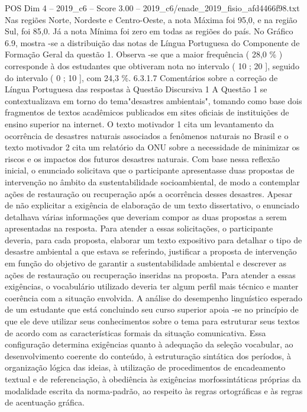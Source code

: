 \begin{textsample}{POS Dim 4 – 2019\_c6 – Score 3.00 – 2019\_c6/enade\_2019\_fisio\_afd4466f98.txt}
Nas regiões Norte, Nordeste e Centro-Oeste, a nota Máxima foi 95,0, e na região Sul, foi 85,0.
Já a nota Mínima foi zero em todas as regiões do país.
No Gráfico 6.9, mostra -se a distribuição das notas de Língua Portuguesa do Componente de Formação Geral da questão 1.
Observa -se que a maior frequência ( 28,0 \% ) corresponde à dos estudantes que obtiveram nota no intervalo ( 10 ; 20 ], seguido do intervalo ( 0 ; 10 ], com 24,3 \%. 6.3.1.7 Comentários sobre a correção de Língua Portuguesa das respostas à Questão Discursiva 1 A Questão 1 se contextualizava em torno do tema"desastres ambientais", tomando como base dois fragmentos de textos acadêmicos publicados em sites oficiais de instituições de ensino superior na internet.
O texto motivador 1 cita um levantamento da ocorrência de desastres naturais associados a fenômenos naturais no Brasil e o texto motivador 2 cita um relatório da ONU sobre a necessidade de minimizar os riscos e os impactos dos futuros desastres naturais.
Com base nessa reflexão inicial, o enunciado solicitava que o participante apresentasse duas propostas de intervenção no âmbito da sustentabilidade socioambiental, de modo a contemplar ações de restauração ou recuperação após a ocorrência desses desastres.
Apesar de não explicitar a exigência de elaboração de um texto dissertativo, o enunciado detalhava várias informações que deveriam compor as duas propostas a serem apresentadas na resposta.
Para atender a essas solicitações, o participante deveria, para cada proposta, elaborar um texto expositivo para detalhar o tipo de desastre ambiental a que estava se referindo, justificar a proposta de intervenção em função do objetivo de garantir a sustentabilidade ambiental e descrever as ações de restauração ou recuperação inseridas na proposta.
Para atender a essas exigências, o vocabulário utilizado deveria ter algum perfil mais técnico e manter coerência com a situação envolvida.
A análise do desempenho linguístico esperado de um estudante que está concluindo seu curso superior apoia -se no princípio de que ele deve utilizar seus conhecimentos sobre o tema para estruturar seus textos de acordo com as características formais da situação comunicativa.
Essa configuração determina exigências quanto à adequação da seleção vocabular, ao desenvolvimento coerente do conteúdo, à estruturação sintática dos períodos, à organização lógica das ideias, à utilização de procedimentos de encadeamento textual e de referenciação, à obediência às exigências morfossintáticas próprias da modalidade escrita da norma-padrão, ao respeito às regras ortográficas e às regras de acentuação gráfica.

\end{textsample}
